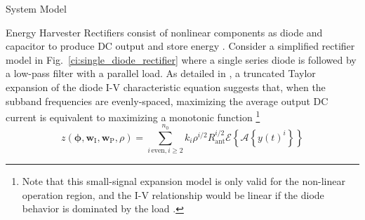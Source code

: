 \documentclass[journal]{IEEEtran}
\begin{document}
\begin{section}{System Model}
\begin{subsection}{Energy Harvester}
			Rectifiers consist of nonlinear components as diode and capacitor to produce DC output and store energy \cite{Pinuela2013}. Consider a simplified rectifier model in Fig.~\ref{ci:single_diode_rectifier} where a single series diode is followed by a low-pass filter with a parallel load. As detailed in \cite{Clerckx2016a,Clerckx2018b}, a truncated Taylor expansion of the diode I-V characteristic equation suggests that, when the subband frequencies are evenly-spaced, maximizing the average output DC current is equivalent to maximizing a monotonic function \footnote{Note that this small-signal expansion model is only valid for the non-linear operation region, and the I-V relationship would be linear if the diode behavior is dominated by the load \cite{Clerckx2016a}.}
			\begin{equation}\label{eq:z}
				z(\boldsymbol{\phi},\boldsymbol{w}_{\text{I}},\boldsymbol{w}_\text{P},\rho)=\sum_{i\,\text{even},i\ge2}^{n_0}{k_i}{\rho^{i/2}}{R_{\text{ant}}^{i/2}}{\mathcal{E}\left\{\mathcal{A}\left\{y(t)^i\right\}\right\}}
			\end{equation}

\end{subsection}
\end{section}
\end{document}
